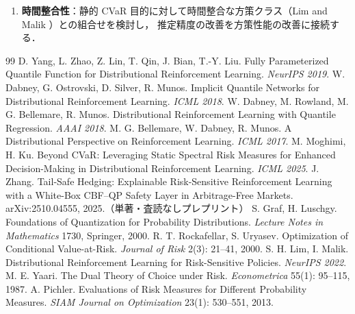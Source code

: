 \documentclass[a4paper,10pt]{jsarticle}
\theoremstyle{definition}
\begin{document}
\begin{enumerate}
  toy 環境でもクラッシュ規模を位置依存（例：$-5(1+|T_3|)(1+x/3)$）に変更すれば状態依存性を低コストで導入でき，FPN 学習の寄与を数時間規模で先行的に検証できる．
  状態ごとに最適配置が異なる環境（実験C のヘッジ損益）では FPN の状態依存最適化が効くかを検証する．
  実験Bはシード数を 10 以上に拡張して統計的な優位性（bootstrap 信頼区間，paired comparison を含む）を確認するとともに，
  独立な複数評価バッチから参照値の標準誤差を評価する．
  \item \textbf{時間整合性}：静的 CVaR 目的に対して時間整合な方策クラス（Lim and Malik \cite{lim2022distributional}）との組合せを検討し，
  推定精度の改善を方策性能の改善に接続する．
\end{enumerate}
\begin{thebibliography}{99}
\footnotesize
{} D. Yang, L. Zhao, Z. Lin, T. Qin, J. Bian, T.-Y. Liu.
Fully Parameterized Quantile Function for Distributional Reinforcement Learning. \textit{NeurIPS 2019}.
 W. Dabney, G. Ostrovski, D. Silver, R. Munos.
Implicit Quantile Networks for Distributional Reinforcement Learning. \textit{ICML 2018}.
 W. Dabney, M. Rowland, M. G. Bellemare, R. Munos.
Distributional Reinforcement Learning with Quantile Regression. \textit{AAAI 2018}.
 M. G. Bellemare, W. Dabney, R. Munos.
A Distributional Perspective on Reinforcement Learning. \textit{ICML 2017}.
 M. Moghimi, H. Ku.
Beyond CVaR: Leveraging Static Spectral Risk Measures for Enhanced Decision-Making in Distributional Reinforcement Learning. \textit{ICML 2025}.
 J. Zhang.
Tail-Safe Hedging: Explainable Risk-Sensitive Reinforcement Learning with a White-Box CBF--QP Safety Layer in Arbitrage-Free Markets.
arXiv:2510.04555, 2025.（単著・査読なしプレプリント）
 S. Graf, H. Luschgy.
Foundations of Quantization for Probability Distributions. \textit{Lecture Notes in Mathematics} 1730, Springer, 2000.
 R. T. Rockafellar, S. Uryasev.
Optimization of Conditional Value-at-Risk. \textit{Journal of Risk} 2(3): 21--41, 2000.
 S. H. Lim, I. Malik.
Distributional Reinforcement Learning for Risk-Sensitive Policies. \textit{NeurIPS 2022}.
 M. E. Yaari.
The Dual Theory of Choice under Risk. \textit{Econometrica} 55(1): 95--115, 1987.
 A. Pichler.
Evaluations of Risk Measures for Different Probability Measures. \textit{SIAM Journal on Optimization} 23(1): 530--551, 2013.

\end{thebibliography}
\end{document}
